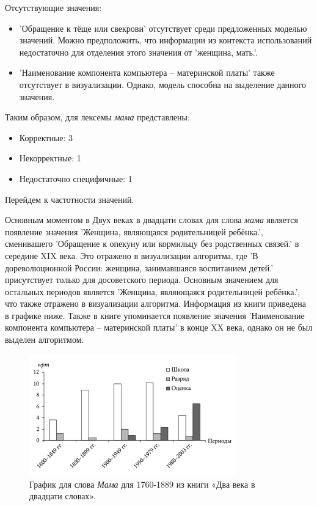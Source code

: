 Отсутствующие значения:
\begin{itemize}
    \item ’Обращение к тёще или свекрови’ отсутствует среди предложенных моделью значений.
Можно предположить, что информации из контекста использований недостаточно для отделения
этого значения от ’женщина, мать.’.

    \item ’Наименование компонента компьютера – материнской платы’ также отсутствует в визуализации.
Однако, модель способна на выделение данного значения.  %
\end{itemize}

Таким образом, для лексемы \textit{мама} представлены:

\begin{itemize}
    \item Корректные: 3
    \item Некорректные: 1
    \item Недостаточно специфичные: 1
\end{itemize}

Перейдем к частотности значений.

Основным моментом в Двух веках в двадцати словах для слова \textit{мама}
является появление значения ’Женщина, являющаяся родительницей ребёнка.’, сменивашего
’Обращение к опекуну или кормильцу без родственных связей.’ в середине XIX века.
Это отражено в визуализации алгоритма, где ’В дореволюционной России: женщина, занимавшаяся воспитанием детей.’
присутствует только для досоветского периода.
Основным значением для остальных периодов является ’Женщина, являющаяся родительницей ребёнка.’,
что также отражено в визуализации алгоритма.
Информация из книги приведена в графике ниже.
Также в книге упоминается появление значения ’Наименование компонента компьютера – материнской платы’
в конце XX века, однако он не был выделен алгоритмом.

\begin{figure}[H]
    \centering %
    \includegraphics[width=0.8\textwidth]{img/book/klassnij/all}
    \caption{График для слова \textit{Мама} для 1760-1889 из книги «Два века в двадцати словах».}
\end{figure}

